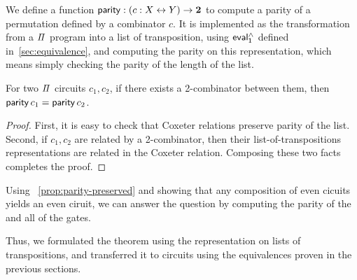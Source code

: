 We define a function $\operatorname{\mathsf{parity}} : (c : X \mathrel{\leftrightarrow} Y) \to {\mathbf{2}}$ to compute a parity of a permutation defined by a combinator
$c$. It is implemented as the transformation from a $\mathit{\Pi}$ program into a list of transposition, using $\evalh_{1}$
defined in~\cref{sec:equivalence}, and computing the parity on this representation, which means simply checking the
parity of the length of the list.

\begin{propositionrep}
  \label{prop:parity-preserved}
  For two $\mathit{\Pi}$ circuits $c_1, c_2$, if there exists a 2-combinator between them, then $\operatorname{\mathsf{parity}} c_1 = \operatorname{\mathsf{parity}} c_2$. 
\end{propositionrep}
\begin{proof}
  First, it is easy to check that Coxeter relations preserve parity of the list. Second, if $c_1, c_2$ are related by a
  2-combinator, then their list-of-transpositions representations are related in the Coxeter relation. Composing these
  two facts completes the proof.
\end{proof}

Using ~\cref{prop:parity-preserved} and showing that any composition of even cicuits yields an even ciruit, we can
answer the question by computing the parity of the  and all of the  gates. 

Thus, we formulated the theorem using the representation on lists of transpositions, and transferred it to circuits using
the equivalences proven in the previous sections.




